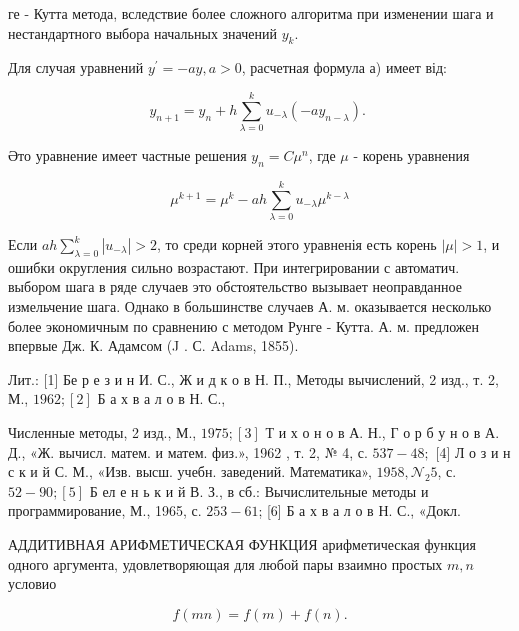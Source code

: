 \documentclass[10pt]{article}
\begin{document}
ге - Кутта метода, вследствие более сложного алгоритма при изменении шага и нестандартного выбора начальных значений $y_{k}$.



Для случая уравнений $y^{\prime}=-a y, a>0$, расчетная формула а) имеет від:



\[

y_{n+1}=y_{n}+h \sum_{\lambda=0}^{k} u_{-\lambda}\left(-a y_{n-\lambda}\right) \text {. }

\]



Әто уравнение имеет частные решения $y_{n}=C \mu^{n}$, где $\mu$ - корень уравнения



\[

\mu^{k+1}=\mu^{k}-a h \sum_{\lambda=0}^{k} u_{-\lambda} \mu^{k-\lambda}

\]



Если $a h \sum_{\lambda=0}^{k}\left|u_{-\lambda}\right|>2$, то среди корней этого уравненія есть корень $|\mu|>1$, и ошибки округления сильно возрастают. При интегрировании с автоматич. выбором шага в ряде случаев это обстоятельство вызывает неоправданное измельчение шага. Однако в большинстве случаев А. м. оказывается несколько более экономичным по сравнению с методом Рунге - Кутта. А. м. предложен впервые Дж. К. Адамсом (J . С. Adams, 1855).



Лит.: [1] Бе р е з и н И. С., Ж и д к о в Н. П., Методы вычислений, 2 изд., т. 2, М., $1962 ;[2]$ Б а х в а л о в Н. С.,

Численные методы, 2 изд., М., $1975 ;[3]$ Т и х о н о в А. Н., Г о р б у н о в А. Д., «Ж. вычисл. матем. и матем. физ.», 1962 , т. 2, № 4, с. $537-48 ;$ [4] Л о з и н с к и й С. М., «Изв. высш. учебн. заведений. Математика», $1958, \mathcal{N}_{2} 5$, с. $52-90 ;[5]$ Б ел е н ь к и й В. З., в сб.: Вычислительные методы и программирование, М., 1965, с. $253-61$; [6] Б а х в а л о в Н. С., «Докл.



АДДИТИВНАЯ АРИФМЕТИЧЕСКАЯ ФУНКЦИЯ арифметическая функция одного аргумента, удовлетворяющая для любой пары взаимно простых $m, n$ условио



\[

f(m n)=f(m)+f(n) .

\]
\end{document}
